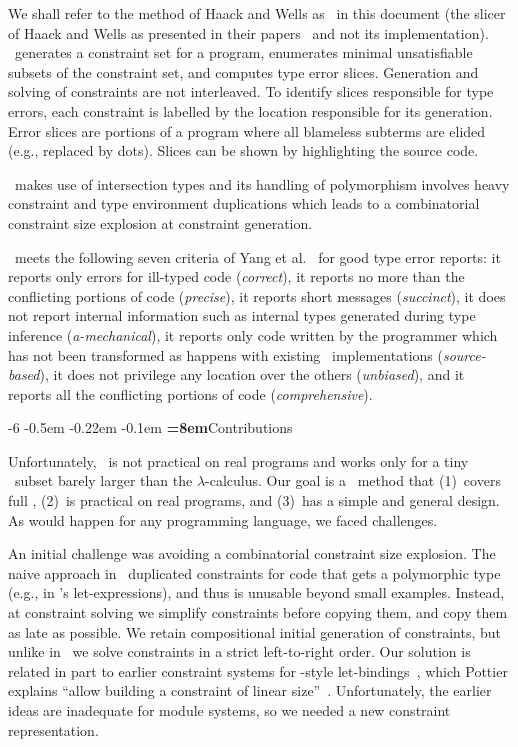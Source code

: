 \documentclass{jfp1}
\makeatletter
\def\subsection{\@startsection{subsection}{2}{\z@}{-0.2\baselineskip plus -0.1\baselineskip minus -0.1\baselineskip}%
    {-0.5em \@plus -0.22em \@minus -0.1em}{\normalfont\normalsize\bfseries}}%
\newcommand{\sectiontitledot}[1]{#1.}
\renewcommand\subsection{\@startsection{subsection}{2}{\z@}%
                            {-6\p@ \@plus -1\p@ \@minus -1\p@}%
                            {-0.5em \@plus -0.22em \@minus -0.1em}%
                            {\normalfont\normalsize\bfseries\boldmath
                             \rightskip=\z@ \@plus 8em\pretolerance=10000\sectiontitledot}}
\makeatother
\begin{document}
We shall refer to the method of Haack and Wells as \HWTES\ in this
document (the slicer of Haack and Wells as presented in their
papers~\cite{Haack+Wells:2003,Haack+Wells:2004} and not its
implementation).  \HWTES\ generates a constraint set for a program,
enumerates minimal unsatisfiable subsets of the constraint set, and
computes type error slices.  Generation and solving of constraints are
not interleaved.  To identify slices responsible for type errors, each
constraint is labelled by the location responsible for its generation.
Error slices are portions of a program where all blameless subterms
are elided (e.g., replaced by dots).  Slices can be shown by
highlighting the source code.

\HWTES\ makes use of intersection types and its handling of
polymorphism involves heavy constraint and type environment
duplications which leads to a combinatorial constraint size explosion
at constraint generation.

\HWTES\ meets the following seven criteria of
Yang et al.~\cite{Yang+Wells+Trinder+Michaelson:2000} for good type
error reports:
%
it reports only errors for ill-typed code (\emph{correct}),
%
it reports no more than the conflicting portions of code
(\emph{precise}),
%
it reports short messages (\emph{succinct}),
%
it does not report internal information such as internal types
generated during type inference (\emph{a-mechanical}),
%
it reports only code written by the programmer
which has not been transformed as happens with existing
\SML\ implementations (\emph{source-based}),
%
it does not privilege any location over the others (\emph{unbiased}),
%
and it reports all the conflicting portions of code
(\emph{comprehensive}).


\subsection{Contributions}


Unfortunately, \HWTES\ is not practical on real programs and works
only for a tiny \SML\ subset barely larger than the
$\lambda$-calculus.  Our goal is a \TES\ method that (1)~covers full
\SML, (2)~is practical on real programs, and (3)~has a simple and
general design.  As would happen for any programming language, we
faced challenges.

An initial challenge was avoiding a combinatorial constraint size
explosion.
%
The naive approach in \HWTES\ duplicated constraints for code that
gets a polymorphic type (e.g., in \SML's let-expressions), and thus is
unusable beyond small examples.
%
Instead, at constraint solving we simplify constraints before copying
them, and copy them as late as possible.  We retain compositional
initial generation of constraints, but unlike in \HWTES\ we solve
constraints in a strict left-to-right order.  Our solution is related
in part to earlier constraint systems for \ML-style
let-bindings~\cite{Pottier:2005,Pottier+Remy:2005,Muller:1994,Gustavsson+Svenningsson:2001,Odersky+Sulzmann+Wehr:1999},
which Pottier explains ``allow building a constraint of linear
size''~\cite{Pottier:2005}.
%
Unfortunately, the earlier ideas are inadequate for module systems, so
we needed a new constraint representation.
\end{document}
